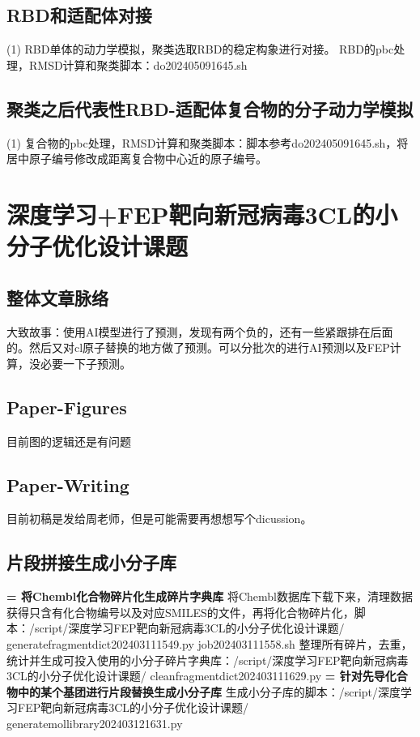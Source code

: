 \subsection{RBD和适配体对接}
\noindent (1) RBD单体的动力学模拟，聚类选取RBD的稳定构象进行对接。  
RBD的pbc处理，RMSD计算和聚类脚本：do202405091645.sh
\subsection{聚类之后代表性RBD-适配体复合物的分子动力学模拟}
\noindent (1) 复合物的pbc处理，RMSD计算和聚类脚本：脚本参考do202405091645.sh，将居中原子编号修改成距离复合物中心近的原子编号。
\section{深度学习+FEP靶向新冠病毒3CL的小分子优化设计课题}
\subsection{整体文章脉络}
大致故事：使用AI模型进行了预测，发现有两个负的，还有一些紧跟排在后面的。然后又对cl原子替换的地方做了预测。可以分批次的进行AI预测以及FEP计算，没必要一下子预测。
\subsection{Paper-Figures}
目前图的逻辑还是有问题
\subsection{Paper-Writing}
\noindent 目前初稿是发给周老师，但是可能需要再想想写个dicussion。
\subsection{片段拼接生成小分子库}
\noindent\textbf{= 将Chembl化合物碎片化生成碎片字典库}
\newline\indent 将Chembl数据库下载下来，清理数据获得只含有化合物编号以及对应SMILES的文件，再将化合物碎片化，脚本：/script/深度学习FEP靶向新冠病毒3CL的小分子优化设计课题/ generatefragmentdict202403111549.py job202403111558.sh
\newline\indent 整理所有碎片，去重，统计并生成可投入使用的小分子碎片字典库：/script/深度学习FEP靶向新冠病毒3CL的小分子优化设计课题/ cleanfragmentdict202403111629.py
\newline\noindent\textbf{= 针对先导化合物中的某个基团进行片段替换生成小分子库}
\newline\indent 生成小分子库的脚本：/script/深度学习FEP靶向新冠病毒3CL的小分子优化设计课题/ generatemollibrary202403121631.py
